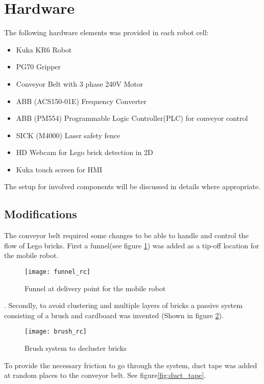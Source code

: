 \section{Hardware}
\label{sec:rc_hardware}
The following hardware elements was provided in each robot cell:

\begin{itemize}
	\item Kuka KR6 Robot
	\item PG70 Gripper
	\item Conveyor Belt with 3 phase 240V Motor
	\item ABB (ACS150-01E) Frequency Converter
	\item ABB (PM554) Programmable Logic Controller(PLC) for conveyor control
	\item SICK (M4000) Laser safety fence
	\item HD Webcam for Lego brick detection in 2D
	\item Kuka touch screen for HMI
	
\end{itemize}

The setup for involved components will be discussed in details where 
appropriate. 

\subsection{Modifications}
The conveyor belt required some changes to be able to handle and control the 
flow of Lego bricks. First a funnel(see figure \ref{fig:funnel}) was added as a 
tip-off 
location for the mobile robot.

\begin{figure}[H]
	\centering
	\texttt{[image: funnel\_rc]}
	\caption{Funnel at delivery point for the mobile robot}
	\label{fig:funnel}
\end{figure}. Secondly, to avoid clustering and 
multiple layers of bricks a passive system consisting of a brush and cardboard 
was invented (Shown in figure \ref{fig:brush}).

\begin{figure}[H]
	\centering
	\texttt{[image: brush\_rc]}
	\caption{Brush system to decluster bricks}
	\label{fig:brush}
\end{figure} To provide the necessary friction to 
go through the system, duct tape was added at random places to the conveyor 
belt. See figure\ref{fig:duct_tape}.

